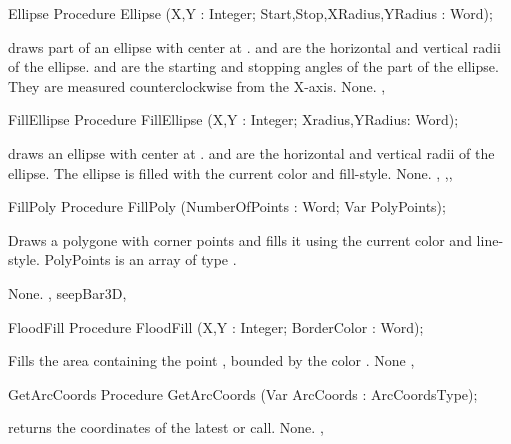 \begin{procedure}{Ellipse}
\Declaration
Procedure Ellipse (X,Y : Integer; Start,Stop,XRadius,YRadius : Word);

\Description
  draws part of an ellipse with center at .
 and  are the horizontal and vertical radii of the
ellipse.  and  are the starting and stopping angles of
the part of the ellipse. 
They are measured counterclockwise from the X-axis.
\Errors
None.
\SeeAlso
{} , 
\end{procedure}

\begin{procedure}{FillEllipse}
\Declaration
Procedure FillEllipse (X,Y : Integer; Xradius,YRadius: Word);

\Description
  draws an ellipse with center at .
 and  are the horizontal and vertical radii of the
ellipse. The ellipse is filled with the current color and fill-style.
\Errors
None.
\SeeAlso
{} ,
,, 
\end{procedure}

\begin{procedure}{FillPoly}
\Declaration
Procedure FillPoly (NumberOfPoints : Word; Var PolyPoints);

\Description

Draws a polygone with  corner points and fills it
using the current color and line-style. 
PolyPoints is an array of type .

\Errors
None.
\SeeAlso
{}, seep{Bar3D}, 
\end{procedure}

\begin{procedure}{FloodFill}
\Declaration
Procedure FloodFill (X,Y : Integer; BorderColor : Word);

\Description

Fills the area containing the point , bounded by the color
.
\Errors
None
\SeeAlso
{}, 
\end{procedure}

\begin{procedure}{GetArcCoords}
\Declaration
Procedure GetArcCoords (Var ArcCoords : ArcCoordsType);

\Description
{} returns the coordinates of the latest  or
 call.
\Errors
None.
\SeeAlso
{}, 
\end{procedure}

